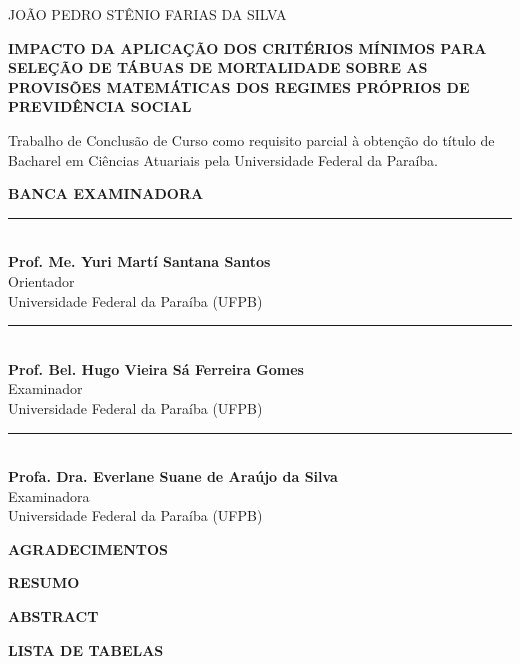 \documentclass[12pt,a4paper,oneside]{report}
\newcommand{\listofquadros}{%
    \listof{quadro}{\hfill\bfseries{LISTA DE QUADROS}\hfill}%
}
\newcommand{\imprimirautor}{JOÃO PEDRO STÊNIO FARIAS DA SILVA}
\newcommand{\imprimirtitulo}{IMPACTO DA APLICAÇÃO DOS CRITÉRIOS MÍNIMOS PARA SELEÇÃO DE TÁBUAS DE MORTALIDADE SOBRE AS PROVISÕES MATEMÁTICAS DOS REGIMES PRÓPRIOS DE PREVIDÊNCIA SOCIAL}
\newcommand{\imprimirorientador}{Prof. Me. Yuri Martí Santana Santos}
\newcommand{\imprimirpreambulo}{Trabalho de Conclusão de Curso como requisito parcial à obtenção do título de Bacharel em Ciências Atuariais pela Universidade Federal da Paraíba.}
\newcommand{\examinadorA}{Prof. Bel. Hugo Vieira Sá Ferreira Gomes}
\newcommand{\examinadorB}{Profa. Dra. Everlane Suane de Araújo da Silva}
\newcommand{\titulocentral}[1]{
    \begin{center}
    \textbf{\fontsize{12}{14}\selectfont #1}
    \end{center}
    \vspace{1.5\baselineskip}
}
\newcommand{\assinatura}[3]{
    \begin{center}
        \rule{8cm}{0.2pt}\\
        \textbf{#1}\\
        #2\\
        #3
    \end{center}
}
\newenvironment{folhadeaprovacao}{
    \newpage
    \setlength{\parindent}{0cm}
}{
    \setlength{\parindent}{1.25cm}
}
\begin{document}
\newpage
\begin{folhadeaprovacao}
    \begin{center}
        {\normalsize\singlespacing\imprimirautor}
        \vspace*{\fill}\vspace*{\fill}
        \begin{center}
            \bfseries\normalsize\singlespacing\imprimirtitulo
        \end{center}
        \vspace*{\fill}
        
        \hspace{.45\textwidth}
        \begin{minipage}{.5\textwidth}
            \singlespacing\imprimirpreambulo
        \end{minipage}
        \vspace*{\fill}
    \end{center}
    
    \vspace{1.0cm}
    
    \begin{center}
        \textbf{BANCA EXAMINADORA}
    \end{center}
    \vspace{0.5cm}
    \assinatura{\imprimirorientador}{Orientador}{Universidade Federal da Paraíba (UFPB)}
    \vspace{0.5cm}
    \assinatura{\examinadorA}{Examinador}{Universidade Federal da Paraíba (UFPB)}
    \vspace{0.5cm}
    \assinatura{\examinadorB}{Examinadora}{Universidade Federal da Paraíba (UFPB)}
    
    
\end{folhadeaprovacao}

\newpage
\titulocentral{AGRADECIMENTOS}



\newpage
\titulocentral{RESUMO}


\newpage
\titulocentral{ABSTRACT}




\newpage

\begin{center}
    \normalsize\bfseries{LISTA DE TABELAS}
\end{center}
\end{document}
